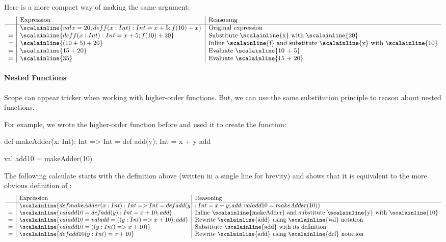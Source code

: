 \documentclass{book}
\begin{document}
Here is a more compact way of making the same argument:
%
\[
\small
\begin{array}{l|l|l}
 & \textrm{Expression} & \textrm{Reasoning} \\
\hline
& \scalainline{val x = 20; def f(x: Int): Int = { x + 5 }; f(10) + x}
& \textrm{Original expression} \\
= & \scalainline{def f(x: Int): Int = { x + 5 }; f(10) + 20}
& \textrm{Substitute \scalainline{x} with \scalainline{20}} \\
= & \scalainline{(10 + 5) + 20}
& \textrm{Inline \scalainline{f} and substitute \scalainline{x} with \scalainline{10}} \\
= & \scalainline{15 + 20}
& \textrm{Evaluate \scalainline{10 + 5}} \\
= & \scalainline{35}
& \textrm{Evaluate \scalainline{15 + 20}}
\end{array}
\]

\paragraph{Nested Functions}
Scope can appear tricker when working with higher-order functions. But, we can
use the same substitution principle to reason about nested functions.

For example, we wrote the  higher-order function before
and used it to create the  function:
\begin{scalacode}
def makeAdder(x: Int): Int => Int = {
  def add(y): Int = { x + y }
  add
}

val add10 = makeAdder(10)
\end{scalacode}

The following calculate starts with the definition above (written in a single
line for brevity) and shows that it is equivalent to the more obvious
definition of :
\[
\small
\begin{array}{l|l|l}
 & \textrm{Expression} & \textrm{Reasoning} \\
\hline
& \multicolumn{2}{l}{\scalainline{
def makeAdder(x: Int): Int => Int = { def add(y): Int = { x + y }; add }; val add10 = makeAdder(10)}}  \\
= & \scalainline{
val add10 = { def add(y): Int = { x + 10 }; add }
} & \textrm{Inline \scalainline{makeAdder} and substitute \scalainline{y} with
\scalainline{10}} \\
= & \scalainline{
val add10 = { val add = ((y: Int) => { x + 10 }); add }
} & \textrm{Rewrite \scalainline{add} using \scalainline{val} notation} \\
= & \scalainline{
val add10 = ((y: Int) => { x + 10 })
} & \textrm{Substitute \scalainline{add} with its definition} \\
= & \scalainline{
def add10(y: Int) = x + 10
} & \textrm{Rewrite \scalainline{add} using \scalainline{def} notation}
\end{array}
\]
\end{document}
